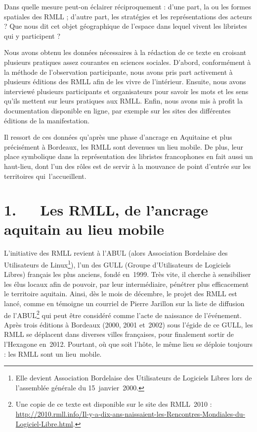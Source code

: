 \documentclass{FramateX}
\begin{document}
\begin{refsection}
Dans quelle mesure peut-on éclairer réciproquement : d'une part, la ou
les formes spatiales des RMLL ; d'autre part, les stratégies et les
représentations des acteurs ? Que nous dit cet objet géographique de
l'espace dans lequel vivent les libristes qui y participent ?

Nous avons obtenu les données nécessaires à la rédaction de ce texte en
croisant plusieurs pratiques assez courantes en sciences sociales.
D'abord, conformément à la méthode de l'observation participante, nous
avons pris part activement à plusieurs éditions des RMLL afin de les
vivre de l'intérieur. Ensuite, nous avons interviewé plusieurs
participants et organisateurs pour savoir les mots et les sens qu'ils
mettent sur leurs pratiques aux RMLL. Enfin, nous avons mis à profit la
documentation disponible en ligne, par exemple sur les sites des
différentes éditions de la manifestation.

Il ressort de ces données qu'après une phase d'ancrage en Aquitaine et
plus précisément à Bordeaux, les RMLL sont devenues un lieu mobile. De
plus, leur place symbolique dans la représentation des libristes
francophones en fait aussi un haut-lieu, dont l'un des rôles est de
servir à la mouvance de point d'entrée sur les territoires
qui~l'accueillent.

\section*{1.~~~Les RMLL, de l'ancrage aquitain au lieu mobile}
{}

L'initiative des RMLL revient à l'ABUL (alors Association Bordelaise des
Utilisateurs de Linux\footnote{Elle devient Association Bordelaise des
Utilisateurs de Logiciels Libres lors de l'assemblée générale du
15~janvier~2000.}), l'un des GULL (Groupe d'Utilisateurs de Logiciels
Libres) français les plus anciens, fondé en~1999. Très vite, il cherche
à sensibiliser les élus locaux afin de pouvoir, par leur intermédiaire,
pénétrer plus efficacement le territoire aquitain. Ainsi, dès le mois
de décembre, le projet des RMLL est lancé, comme en témoigne un
courriel de Pierre Jarillon sur la liste de diffusion de
l'ABUL\footnote{Une copie de ce texte est disponible sur le site des
RMLL~2010 : \url{http://2010.rmll.info/Il-y-a-dix-ans-naissaient-les-Rencontres-Mondiales-du-Logiciel-Libre.html}.}
qui peut être considéré comme l'acte de naissance de l'événement. Après
trois éditions à Bordeaux (2000, 2001 et~2002) sous l'égide de ce GULL,
les RMLL se déplacent dans diverses villes françaises, pour finalement
sortir de l'Hexagone en~2012. Pourtant, où que soit l'hôte, le même
lieu se déploie toujours : les RMLL sont un lieu~mobile.


\end{refsection}
\end{document}
